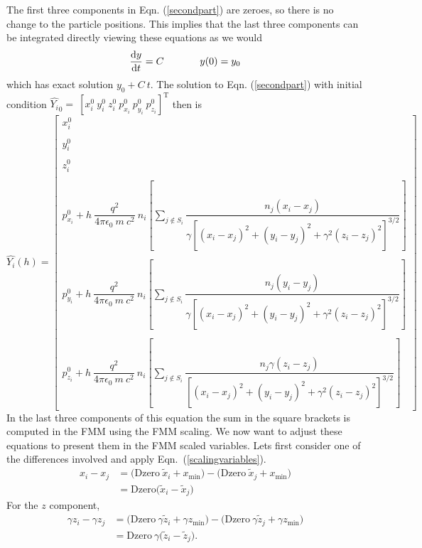 \documentclass[oneside,12pt]{book}
\begin{document}
The first three components in Eqn. (\ref{secondpart}) are zeroes, so there is no change to the particle positions.  This implies that the last three components can be integrated directly viewing these equations as we would
\[\dfrac{\text{d}y}{\text{d}t}=C \hspace{0.5in} y(0)=y_0\]
which has exact solution $y_0+C \ t$.  The solution to Eqn. (\ref{secondpart}) with initial condition $\hat{Y_i}_0=~[x_i^0 \ y_i^0 \ z_i^0 \ p_{x_i}^0 \ p_{y_i}^0 \ p_{z_i}^0]^\text{T}$ then is
\begin{equation}
\hat{Y_i}(h)=\left[
\begin{array}{c}
x_i^0
\\
\\
y_i^0
\\
\\
z_i^0
\\
\\
p_{x_i}^0+h \ \dfrac{q^2}{4 \pi \epsilon_0 \ m \ c^2} \ n_i\left[
\displaystyle\sum\limits_{j \notin S_i}
 \dfrac{n_j (x_i-x_j)}{\gamma[(x_i-x_j)^2+(y_i-y_j)^2+\gamma^2(z_i-z_j)^2]^{3 \slash 2}}\right]
\\
\\
p_{y_i}^0+h \ \dfrac{q^2}{4 \pi \epsilon_0 \ m \ c^2} \ n_i\left[
\displaystyle\sum\limits_{j \notin S_i}
 \dfrac{n_j (y_i-y_j)}{\gamma[(x_i-x_j)^2+(y_i-y_j)^2+\gamma^2(z_i-z_j)^2]^{3 \slash 2}}\right]
\\
\\
p_{z_i}^0+h \ \dfrac{q^2}{4 \pi \epsilon_0 \ m \ c^2} \ n_i\left[
\displaystyle\sum\limits_{j \notin S_i}
 \dfrac{n_j \gamma(z_i-z_j)}{[(x_i-x_j)^2+(y_i-y_j)^2+\gamma^2(z_i-z_j)^2]^{3 \slash 2}}\right]
\end{array}
\right]
\label{longrangesoln}
\end{equation}
In the last three components of this equation the sum in the square brackets is computed in the FMM using the FMM scaling.  We now want to adjust these equations to present them in the FMM scaled variables.  Lets first consider one of the differences involved and apply Eqn.\ (\ref{scalingvariables}).
\begin{align*}
x_i-x_j&=\big(\text{Dzero} \ \tilde{x}_i + x_{\min} \big) - \big( \text{Dzero} \ \tilde{x}_j + x_{\min} \big)\\
&=\text{Dzero} \big(\tilde{x}_i - \tilde{x}_j \big)
\end{align*}
For the $z$ component,
\begin{align*}
\gamma z_i-\gamma z_j&=\big(\text{Dzero} \ \gamma \tilde{z}_i + \gamma z_{\min} \big) - \big( \text{Dzero} \ \gamma \tilde{z}_j + \gamma z_{\min} \big)\\
&=\text{Dzero} \ \gamma  \big(\tilde{z}_i - \tilde{z}_j \big).
\end{align*}
\end{document}
